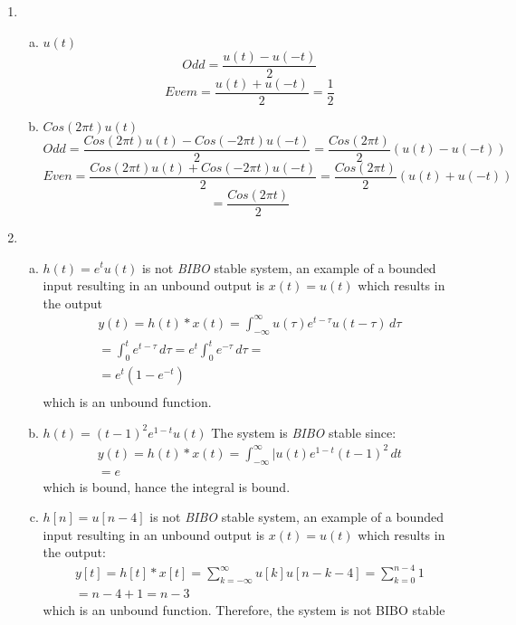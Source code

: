 \documentclass[10pt, letterpaper]{article}
\begin{document}
\begin{enumerate}[1)]
\item
    \begin{enumerate}[a.]
    \item $u(t)$
        \[ Odd = \frac{u(t) - u(-t)}{2}\]
        \[Evem = \frac{u(t) + u(-t)}{2} =  \frac{1}{2}\]

    \item $Cos(2\pi t)u(t)$
        \[Odd = \frac{Cos(2\pi t)u(t) - Cos(-2\pi t)u(-t)}{2} = \frac{Cos(2\pi t)}{2}(u(t) - u(-t))\]
        \[Even = \frac{Cos(2\pi t)u(t) + Cos(-2\pi t)u(-t)}{2} = \frac{Cos(2\pi t)}{2}(u(t) + u(-t))\]
        \[ = \frac{Cos(2\pi t)}{2}\]
    \end{enumerate}


\item
    \begin{enumerate}[a.]
    \item $h(t) = e^tu(t)$ is not \emph{BIBO} stable system, an example of a bounded input 
        resulting in an unbound output is $x(t) = u(t)$ which results in the output
        \begin{align*}
        y(t) = h(t) * x(t) = 
        \int_{-\infty}^{\infty} u(\tau)e^{t - \tau}u(t - \tau) \, d\tau \\
        = \int_{0}^{t}e^{t - \tau} \, d\tau 
        = e^t \int_{0}^{t}e^{-\tau} \, d\tau = \\
        = \boxed{e^t (1 - e^{-t})}
        \\
        \end{align*}
        which is an unbound function.

    \item $h(t) = (t - 1)^2e^{1-t}u(t)$ The system is \emph{BIBO} stable since:
        \begin{align*}
        	y(t) = h(t) * x(t) = 
        	\int_{-\infty}^{\infty} |u(t)e^{1 - t}(t - 1)^2 \, dt \\
        	= e
        \end{align*}
        which is bound, hance the integral is bound.
    
    \item $h[n] = u[n - 4]$ is not \emph{BIBO} stable system, an example of a bounded input 
        resulting in an unbound output is $x(t) = u(t)$ which results in the output:
        \begin{align*}
        y[t] = h[t] * x[t] = 
        \sum_{k = -\infty}^{\infty} u[k] u[n - k - 4] = \sum_{k = 0}^{n - 4} 1 \\
        = n - 4 + 1 = \boxed{n - 3}
        \end{align*}
        which is an unbound function. Therefore, the system is not BIBO stable


\end{enumerate}
\end{enumerate}
\end{document}
